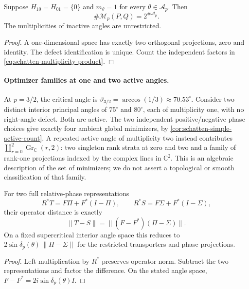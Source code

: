 \begin{corollary}
\label{cor:schatten-simple-active-count}
Suppose $H_{10}=H_{01}=\{0\}$ and $m_\theta=1$ for every
$\theta\in\mathcal A_p$. Then
\[
 \#\mathcal M_p(P,Q)=2^{\#\mathcal A_p}.
\]
The multiplicities of inactive angles are unrestricted.
\end{corollary}

\begin{proof}
A one-dimensional space has exactly two orthogonal projections, zero and
identity. The defect identification is unique. Count the independent
factors in \cref{eq:schatten-multiplicity-product}.
\end{proof}

\paragraph{Optimizer families at one and two active angles.}
At $p=3/2$, the critical angle is
$\vartheta_{3/2}=\arccos(1/3)\approx70.53^\circ$.
Consider two distinct interior principal angles of $75^\circ$ and
$80^\circ$, each of multiplicity one, with no right-angle defect.
Both are active. The two independent positive/negative phase choices
give exactly four ambient global minimizers, by
\cref{cor:schatten-simple-active-count}. A repeated active angle of
multiplicity two instead contributes
$\coprod_{r=0}^{2}\operatorname{Gr}_{\mathbb C}(r,2)$:
two singleton rank strata at zero and two and a family
of rank-one projections indexed by the complex lines in $\mathbb C^2$.
This is an algebraic description of the set of minimizers; we do not
assert a topological or smooth classification of that family.

\begin{corollary}
\label{cor:schatten-phase-parameter-distance}
For two full relative-phase representations
\[
 R^*T=F\Pi+F^*(I-\Pi),\qquad
 R^*S=F\Sigma+F^*(I-\Sigma),
\]
their operator distance is exactly
\[
 \|T-S\|=\|(F-F^*)(\Pi-\Sigma)\|.
\]
On a fixed supercritical interior angle space this reduces to
$2\sin\delta_p(\theta)\,\|\Pi-\Sigma\|$ for the restricted transporters
and phase projections.
\end{corollary}

\begin{proof}
Left multiplication by $R^*$ preserves operator norm. Subtract the two
representations and factor the difference. On the stated angle space,
$F-F^*=2i\sin\delta_p(\theta)I$.
\end{proof}

